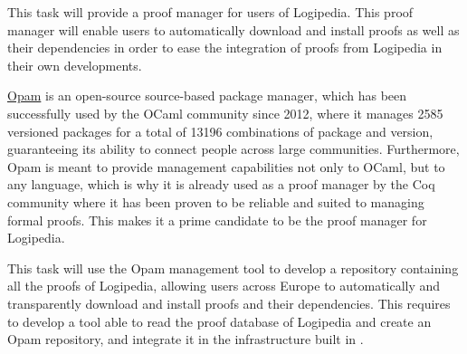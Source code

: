 \begin{workpackage}[id=access,type=RTD,wphases=1-48,
  short=Access,%
  title={Access},
  lead=Inr,InrRM=48,OcaRM=6,EduRM=12]
\begin{tasklist}
  \begin{task}[id=opam,
      title=Giving access to the infrastructure in proof systems,
      shorttitle=Giving access to the infrastructure in proof systems,
      lead=Oca,OcaRM=6,wphases=15-24]
    This task will provide a proof manager for users of Logipedia. This proof
    manager will enable users to automatically download and install
    proofs as well as their dependencies in order to ease the
    integration of proofs from Logipedia in their own developments.

    \href{https://opam.ocaml.org/}{Opam} is an open-source source-based package manager,
    which has been successfully used by the OCaml community since
    2012, where it manages 2585 versioned packages for a total of
    13196 combinations of package and version, guaranteeing its
    ability to connect people across large communities. Furthermore,
    Opam is meant to provide management capabilities not only to
    OCaml, but to any language, which is why it is already used as a
    proof manager by the Coq community where it has been proven to be
    reliable and suited to managing formal proofs. This makes it a
    prime candidate to be the proof manager for Logipedia.

    This task will use the Opam management tool to develop a
    repository containing all the proofs of Logipedia, allowing users
    across Europe to automatically and transparently download and
    install proofs and their dependencies. This
    requires to develop a tool able to read the proof
    database of Logipedia and create an Opam repository,
    and integrate it in the infrastructure built in .
  \end{task}


\end{tasklist}
\end{workpackage}
